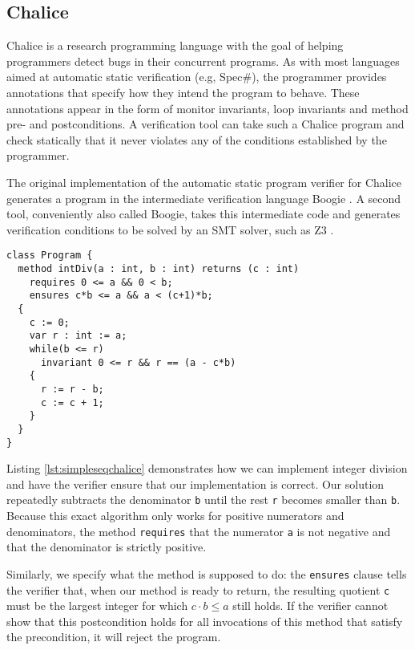 
\subsection{Chalice}\label{sct:chalice}
Chalice \cite{LMS09,LM09} is a research programming language with the goal of helping programmers detect bugs in their concurrent programs. 
As with most languages aimed at automatic static verification (e.g, Spec\#), the programmer provides annotations that specify how they intend the program to behave.
These annotations appear in the form of monitor invariants, loop invariants and method pre- and postconditions.
A verification tool can take such a Chalice program and check statically that it never violates any of the conditions established by the programmer.

The original implementation of the automatic static program verifier for Chalice generates a program in the intermediate verification language Boogie \cite{ByECD+06}.
A second tool, conveniently also called Boogie, takes this intermediate code and generates verification conditions to be solved by an SMT solver, such as Z3 \cite{dMB08}.

\begin{lstlisting}[language=Chalice,float,caption={Loop invariants, pre- and post conditions in a Chalice program},label=lst:simpleseqchalice]
class Program {
  method intDiv(a : int, b : int) returns (c : int)
    requires 0 <= a && 0 < b;
    ensures c*b <= a && a < (c+1)*b;
  {
    c := 0;
    var r : int := a;
    while(b <= r)
      invariant 0 <= r && r == (a - c*b)
    {
      r := r - b;
      c := c + 1;
    }
  }
}
\end{lstlisting}

Listing \ref{lst:simpleseqchalice} demonstrates how we can implement integer division and have the verifier ensure that our implementation is correct.
Our solution repeatedly subtracts the denominator \lstinline!b! until the rest \lstinline!r! becomes smaller than \lstinline!b!. 
Because this exact algorithm only works for positive numerators and denominators, the method \lstinline[language=chalice]!requires! that the numerator \lstinline!a! is not negative and that the denominator is strictly positive.

Similarly, we specify what the method is supposed to do: the \lstinline[language=Chalice]!ensures! clause tells the verifier that, when our method is ready to return, the resulting quotient \lstinline!c! must be the largest integer for which $c \cdot b \leq a$ still holds.
If the verifier cannot show that this postcondition holds for all invocations of this method that satisfy the precondition, it will reject the program.

